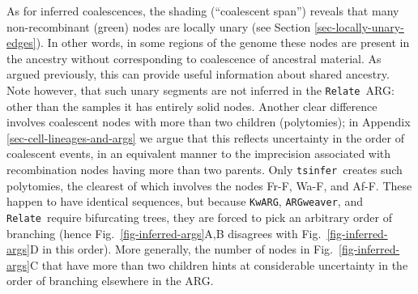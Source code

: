 \documentclass{article}
\newcommand{\noderef}[1]{\textsf{#1}}
\newcommand{\tsinfer}[0]{\texttt{tsinfer}}
\newcommand{\kwarg}[0]{\texttt{KwARG}}
\newcommand{\argweaver}[0]{\texttt{ARGweaver}}
\newcommand{\relate}[0]{\texttt{Relate}}
\begin{document}
As for inferred coalescences, the shading (``coalescent span'')
reveals that many non-recombinant (green) nodes are
locally unary (see Section \ref{sec-locally-unary-edges}). In other words,
in some regions of the genome these nodes are present in the ancestry without
corresponding to coalescence of ancestral material. As argued previously, this can provide useful
information about shared ancestry. Note however, that such unary segments are not inferred
in the \relate\ ARG: other than the samples it has entirely solid nodes.
Another clear difference involves coalescent nodes with more than two children (polytomies);
in Appendix \ref{sec-cell-lineages-and-args} we argue that this reflects
uncertainty in the order of coalescent events, in an equivalent
manner to the imprecision associated with recombination nodes having more
than two parents. Only \tsinfer\ creates such polytomies, the clearest of which
involves the nodes \noderef{Fr-F}, \noderef{Wa-F}, and \noderef{Af-F}. These
happen to have identical sequences, but because \kwarg, \argweaver, and \relate\ require
bifurcating trees, they are forced to pick an arbitrary order of branching
(hence Fig.~\ref{fig-inferred-args}A,B disagrees with Fig.~\ref{fig-inferred-args}D
in this order).
More generally, the number of nodes in Fig.~\ref{fig-inferred-args}C
that have more than two children hints at considerable uncertainty in
the order of branching elsewhere in the ARG.

\end{document}
